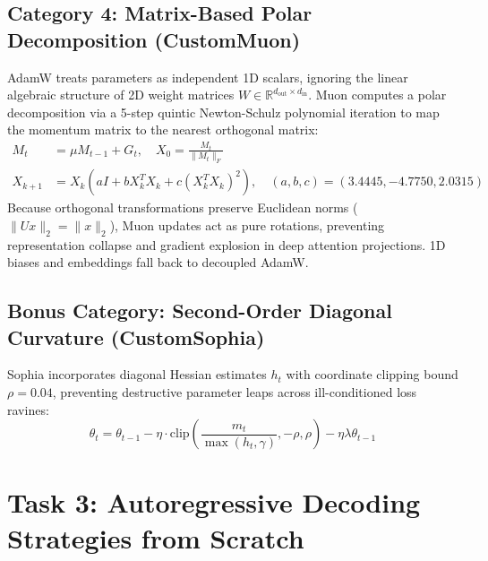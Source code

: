 \documentclass[11pt,a4paper]{article}
\begin{document}
\subsection{Category 4: Matrix-Based Polar Decomposition (CustomMuon)}
AdamW treats parameters as independent 1D scalars, ignoring the linear algebraic structure of 2D weight matrices $W \in \mathbb{R}^{d_{\text{out}} \times d_{\text{in}}}$. Muon computes a polar decomposition via a 5-step quintic Newton-Schulz polynomial iteration to map the momentum matrix to the nearest orthogonal matrix:
\begin{align}
M_t &= \mu M_{t-1} + G_t, \quad X_0 = \frac{M_t}{\|M_t\|_F} \\
X_{k+1} &= X_k (a I + b X_k^T X_k + c (X_k^T X_k)^2), \quad (a, b, c) = (3.4445, -4.7750, 2.0315)
\end{align}
Because orthogonal transformations preserve Euclidean norms ($\|U x\|_2 = \|x\|_2$), Muon updates act as pure rotations, preventing representation collapse and gradient explosion in deep attention projections. 1D biases and embeddings fall back to decoupled AdamW.

\subsection{Bonus Category: Second-Order Diagonal Curvature (CustomSophia)}
Sophia incorporates diagonal Hessian estimates $h_t$ with coordinate clipping bound $\rho=0.04$, preventing destructive parameter leaps across ill-conditioned loss ravines:
\begin{equation}
\theta_t = \theta_{t-1} - \eta \cdot \text{clip}\left(\frac{m_t}{\max(h_t, \gamma)}, -\rho, \rho\right) - \eta \lambda \theta_{t-1}
\end{equation}

\section{Task 3: Autoregressive Decoding Strategies from Scratch}
\end{document}
